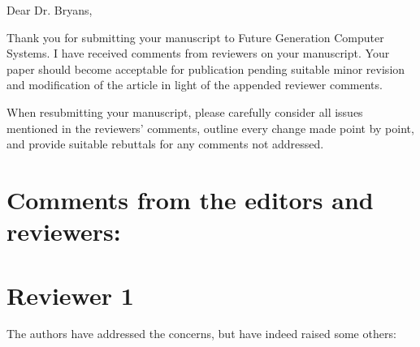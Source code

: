 \documentclass{article}
\newcommand{\showComments}{yes} %
\newcommand{\com}[2]{\ifthenelse{\equal{\showComments}{yes}}{\textcolor{#1}{#2}}{}}
\newcommand{\comment}[1]{\com{red}{#1}}
\begin{document}




Dear Dr. Bryans,

Thank you for submitting your manuscript to Future Generation Computer Systems. I have received comments from reviewers on your manuscript. Your paper should become acceptable for publication pending suitable minor revision and modification of the article in light of the appended reviewer comments.

When resubmitting your manuscript, please carefully consider all issues mentioned in the reviewers' comments, outline every change made point by point, and provide suitable rebuttals for any comments not addressed.


\section*{Comments from the editors and reviewers:}
\section*{Reviewer 1}

The authors have addressed the concerns, but have indeed raised some others:
\end{document}
